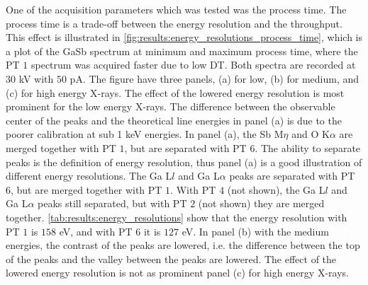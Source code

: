 One of the acquisition parameters which was tested was the process time.
The process time is a trade-off between the energy resolution and the throughput.
This effect is illustrated in \cref{fig:results:energy_resolutions_process_time}, which is a plot of the GaSb spectrum at minimum and maximum process time, where the PT $1$ spectrum was acquired faster due to low DT.
Both spectra are recorded at $30$ kV with $50$ pA.
The figure have three panels, (a) for low, (b) for medium, and (c) for high energy X-rays.
The effect of the lowered energy resolution is most prominent for the low energy X-rays.
The difference between the observable center of the peaks and the theoretical line energies in panel (a) is due to the poorer calibration at sub 1 keV energies.
In panel (a), the Sb M$\eta$ and O K$\alpha$ are merged together with PT $1$, but are separated with PT $6$.
The ability to separate peaks is the definition of energy resolution, thus panel (a) is a good illustration of different energy resolutions.
The Ga L$l$ and Ga L$\alpha$ peaks are separated with PT $6$, but are merged together with PT $1$.
With PT $4$ (not shown), the Ga L$l$ and Ga L$\alpha$ peaks still separated, but with PT $2$ (not shown) they are merged together.
\cref{tab:results:energy_resolutions} show that the energy resolution with PT $1$ is $158$ eV, and with PT $6$ it is $127$ eV.
In panel (b) with the medium energies, the contrast of the peaks are lowered, i.e. the difference between the top of the peaks and the valley between the peaks are lowered.
The effect of the lowered energy resolution is not as prominent panel (c) for high energy X-rays.



